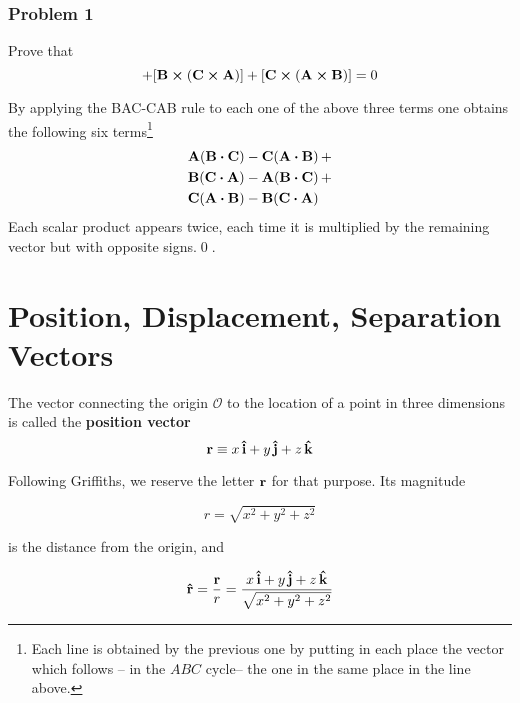 \subsubsection{Problem 1}
Prove that 
\begin{equation*}
[\vb{A} \cross (\vb{B} \cross \vb{C})] + [\vb{B} \cross (\vb{C} \cross \vb{A})] +  [\vb{C} \cross (\vb{A} \cross \vb{B})] = 0  
\end{equation*}

By applying the BAC-CAB rule to each one of the above three terms one obtains the following six   terms\footnote{Each line is obtained by the previous one by putting in each place the vector which follows -- in the $ABC$ cycle-- the one in the same place in the line above.}
\begin{equation*}
\begin{aligned} 
\vb{A} (\vb{B} \vdot \vb{C}) &- \vb{C} (\vb{A} \vdot \vb{B})\, +\\
\vb{B} (\vb{C} \vdot \vb{A}) &- \vb{A} (\vb{B} \vdot \vb{C})\, +\\
\vb{C} (\vb{A} \vdot \vb{B}) &- \vb{B} (\vb{C} \vdot \vb{A})
\end{aligned}
\end{equation*}
Each scalar product appears twice, each time it is multiplied by the remaining vector but with opposite signs.\qed. 


\section{Position, Displacement, Separation Vectors}

The vector connecting the origin $\mathcal{O}$ to the location of a point in three dimensions is called the \textbf{position vector}
\begin{equation}
\vb{r} \equiv x \, \vu{i} + y \, \vu{j} + z \, \vu{k} 
\end{equation}

Following Griffiths, we reserve the letter $\vb{r}$ for that purpose. Its magnitude 

\begin{equation}
r = \sqrt{x^2 + y^2 + z^2} 
\end{equation}

is the distance from the origin, and 

\begin{equation}
\vu{r} = \frac{\vb{r}}{r} = \frac{x \, \vu{i} + y \, \vu{j} + z \, \vu{k}}{\sqrt{x^2 + y^2 + z^2}} 
\end{equation}


